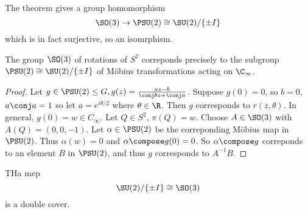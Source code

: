 \documentclass[a4paper]{article}
\begin{document}
The theorem gives a group homomorphism
\[
  \SO(3) \to \PSU(2) \cong \SU(2)/\{\pm I\}
\]
which is in fact surjective, so an isomrphism.

\begin{theorem}
  The group \(\SO(3)\) of rotations of \(S^2\) correponds precisely to the subgroup \(\PSU(2) \cong \SU(2)/\{\pm I\}\) of Möbius transformations acting on \(\C_\infty\).
\end{theorem}

\begin{proof}
  Let \(g \in \PSU(2) \leq G, g(z) = \frac{az - b}{\conj b z + \conj a}\). Suppose \(g(0) = 0\), so \(b = 0\), \(a \conj a = 1\) so let \(a = e^{i\theta/2}\) where \(\theta \in \R\). Then \(g\) corresponds to \(r(z, \theta)\). In general, \(g(0) = w \in C_\infty\). Let \(Q \in S^2\), \(\pi(Q) = w\). Choose \(A \in \SO(3)\) with \(A(Q) = (0, 0, -1)\). Let \(\alpha \in \PSU(2)\) be the correponding Möbius map in \(\PSU(2)\). Thus \(\alpha(w) = 0\) and \(\alpha \compose g(0) = 0\). So \(\alpha \compose g\) correponds to an element \(B\) in \(\PSU(2)\), and thus \(g\) corresponds to \(A^{-1}B\).
\end{proof}

\begin{remark}
  THa mep
  \[
    \SU(2)/\{\pm I\} \cong \SO(3)
  \]
  is a double cover.
\end{remark}






\printindex

\iffalse
Other courses that might be useful: topology, part of analysis II (differentiability in R^n and inverse function theorem)

Leads to: IID Differential Geometry

Reading List

P.\ Wilson, Curverd Spaces, CUP 2008
From classical geometries to elementary differential geometry
\fi
\end{document}
